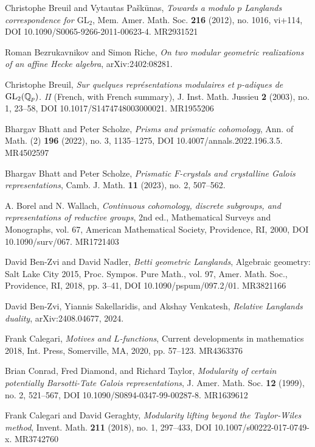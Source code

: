 \begin{refs}
\item[{[BP12]}] Christophe Breuil and Vytautas Pa\v{s}k\={u}nas, \emph{Towards a modulo $p$ Langlands correspondence for $\mathrm{GL}_2$}, Mem. Amer. Math. Soc. \textbf{216} (2012), no. 1016, vi+114, DOI 10.1090/S0065-9266-2011-00623-4. MR2931521
\item[{[BR24]}] Roman Bezrukavnikov and Simon Riche, \emph{On two modular geometric realizations of an affine Hecke algebra}, arXiv:2402:08281.
\item[{[Bre03]}] Christophe Breuil, \emph{Sur quelques repr\'esentations modulaires et $p$-adiques de $\mathrm{GL}_2(\mathbb{Q}_p)$. II} (French, with French summary), J. Inst. Math. Jussieu \textbf{2} (2003), no. 1, 23--58, DOI 10.1017/S1474748003000021. MR1955206
\item[{[BS22]}] Bhargav Bhatt and Peter Scholze, \emph{Prisms and prismatic cohomology}, Ann. of Math. (2) \textbf{196} (2022), no. 3, 1135--1275, DOI 10.4007/annals.2022.196.3.5. MR4502597
\item[{[BS23]}] Bhargav Bhatt and Peter Scholze, \emph{Prismatic $F$-crystals and crystalline Galois representations}, Camb. J. Math. \textbf{11} (2023), no. 2, 507--562.
\item[{[BW00]}] A. Borel and N. Wallach, \emph{Continuous cohomology, discrete subgroups, and representations of reductive groups}, 2nd ed., Mathematical Surveys and Monographs, vol. 67, American Mathematical Society, Providence, RI, 2000, DOI 10.1090/surv/067. MR1721403
\item[{[BZN18]}] David Ben-Zvi and David Nadler, \emph{Betti geometric Langlands}, Algebraic geometry: Salt Lake City 2015, Proc. Sympos. Pure Math., vol. 97, Amer. Math. Soc., Providence, RI, 2018, pp. 3--41, DOI 10.1090/pspum/097.2/01. MR3821166
\item[{[BZSV24]}] David Ben-Zvi, Yiannis Sakellaridis, and Akshay Venkatesh, \emph{Relative Langlands duality}, arXiv:2408.04677, 2024.
\item[{[Cal20]}] Frank Calegari, \emph{Motives and $L$-functions}, Current developments in mathematics 2018, Int. Press, Somerville, MA, 2020, pp. 57--123. MR4363376
\item[{[CDT99]}] Brian Conrad, Fred Diamond, and Richard Taylor, \emph{Modularity of certain potentially Barsotti-Tate Galois representations}, J. Amer. Math. Soc. \textbf{12} (1999), no. 2, 521--567, DOI 10.1090/S0894-0347-99-00287-8. MR1639612
\item[{[CG18]}] Frank Calegari and David Geraghty, \emph{Modularity lifting beyond the Taylor-Wiles method}, Invent. Math. \textbf{211} (2018), no. 1, 297--433, DOI 10.1007/s00222-017-0749-x. MR3742760

\end{refs}
